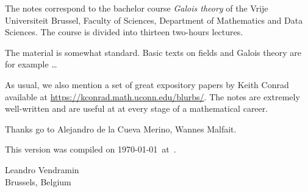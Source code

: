 \preface

The notes correspond to the bachelor 
course \emph{Galois theory} of the 
Vrije Universiteit Brussel, 
Faculty of Sciences, 
Department of Mathematics and Data Sciences. The course
is divided into thirteen two-hours lectures. 

The material is somewhat standard. Basic texts on fields and Galois theory 
are for example \cite{MR1645586}\dots

As usual, we also mention a set of great expository papers by 
Keith Conrad available at 
\url{https://kconrad.math.uconn.edu/blurbs/}. 
The notes are extremely well-written and are useful at  
at every stage of a mathematical career. 
 
Thanks go to Alejandro de la Cueva Merino, Wannes Malfait. 

This version 
was compiled on \today~at~\currenttime.

\bigskip
\begin{flushright}
Leandro Vendramin\\Brussels, Belgium\par
\end{flushright}
